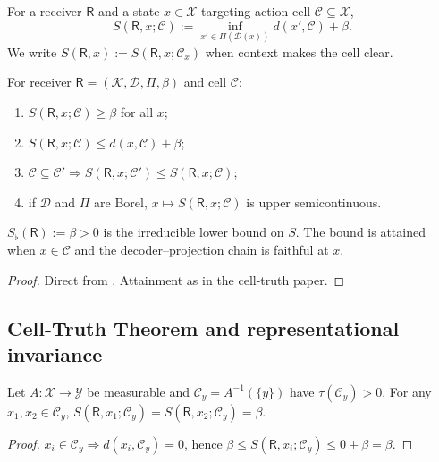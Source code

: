\documentclass[11pt,a4paper]{article}
\newcommand{\K}{\mathcal{K}}
\newcommand{\D}{\mathcal{D}}
\newcommand{\X}{\mathcal{X}}
\newcommand{\Y}{\mathcal{Y}}
\newcommand{\Cell}{\mathcal{C}}
\newcommand{\receiver}{\mathsf{R}}
\newcommand{\Sfloor}{S_{\flat}}
\begin{document}
\begin{definition}[$S$-functional]\label{def:S}
For a receiver $\receiver$ and a state $x\in\X$ targeting action-cell
$\Cell\subseteq\X$,
\[
S(\receiver,x;\Cell):=\inf_{x'\in\Pi(\D(x))}d(x',\Cell)+\beta.
\]
We write $S(\receiver,x):=S(\receiver,x;\Cell_x)$ when context makes
the cell clear.
\end{definition}

\begin{proposition}\label{prop:basic-S}
For receiver $\receiver=(\K,\D,\Pi,\beta)$ and cell $\Cell$:
\begin{enumerate}[label=(\arabic*),leftmargin=*]
\item $S(\receiver,x;\Cell)\ge\beta$ for all $x$;
\item $S(\receiver,x;\Cell)\le d(x,\Cell)+\beta$;
\item $\Cell\subseteq\Cell'\Rightarrow S(\receiver,x;\Cell')\le
S(\receiver,x;\Cell)$;
\item if $\D$ and $\Pi$ are Borel, $x\mapsto S(\receiver,x;\Cell)$ is
upper semicontinuous.
\end{enumerate}
\end{proposition}

\begin{theorem}\label{thm:floor}
$\Sfloor(\receiver):=\beta>0$ is the irreducible lower bound on $S$.
The bound is attained when $x\in\Cell$ and the decoder--projection
chain is faithful at $x$.
\end{theorem}

\begin{proof}
Direct from . Attainment as in the cell-truth paper.
\end{proof}

\subsection{Cell-Truth Theorem and representational invariance}

\begin{theorem}\label{thm:cell-truth}
Let $A:\X\to\Y$ be measurable and $\Cell_y=A^{-1}(\{y\})$ have
$\tau(\Cell_y)>0$. For any $x_1,x_2\in\Cell_y$,
$S(\receiver,x_1;\Cell_y)=S(\receiver,x_2;\Cell_y)=\beta$.
\end{theorem}

\begin{proof}
$x_i\in\Cell_y\Rightarrow d(x_i,\Cell_y)=0$, hence
$\beta\le S(\receiver,x_i;\Cell_y)\le 0+\beta=\beta$.
\end{proof}
\end{document}
